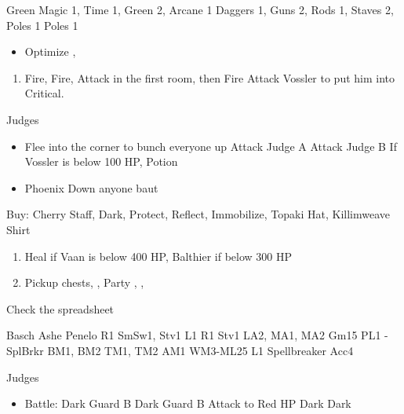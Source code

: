 \begin{liscense}
\begin{itemize}
\vaanf Green Magic 1, Time 1, Green 2, Arcane 1
\balthierf Daggers 1, Guns 2, Rods 1, Staves 2, Poles 1
\baschf Poles 1
\end{itemize}
\end{liscense}
\begin{equip}
\begin{itemize}
\item Optimize \basch, \vaan
\end{itemize}
\end{equip}
\begin{enumerate}
\item Fire, Fire, Attack in the first room, then Fire Attack Vossler to put him into Critical.
\end{enumerate}
\begin{battle}{Judges}
\begin{itemize}
\item Flee into the corner to bunch everyone up
\vaanf Attack Judge A
\baschf Attack Judge B
\balthierf If Vossler is below 100 HP, Potion
\item Phoenix Down anyone baut \balthier
\end{itemize}
\end{battle}
\begin{shop}
Buy: Cherry Staff, Dark, Protect, Reflect, Immobilize, Topaki Hat, Killimweave Shirt
\end{shop}
\begin{enumerate}
\item Heal if Vaan is below 400 HP, Balthier if below 300 HP
\item Pickup chests, \leader{\vaan}, Party \vaan, \penelo, \ashe
\end{enumerate}
\begin{liscense}
Check the spreadsheet

Basch	Ashe	Penelo
R1	SmSw1, Stv1	L1
	R1	Stv1
		LA2, MA1, MA2
		Gm15
		PL1 - SplBrkr
		BM1, BM2
		TM1, TM2
		AM1
	WM3-ML25	L1
	Spellbreaker	
	Acc4	
\end{liscense}
\begin{battle}{Judges}
\begin{itemize}
\vaanf Reflect \ashe
\ashef Heal \vaan
\penelof Reflect \penelo
\vaanf Reflect \vaan
\item Battle:
\vaanf Dark Guard B
\penelof Dark Guard B
\ashef Attack \penelo to Red HP
\vaanf Dark \penelo
\penelof Dark \penelo
\end{itemize}
\end{battle}